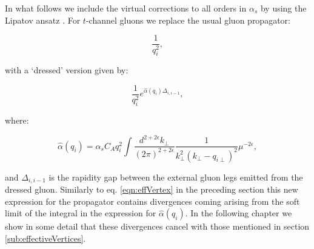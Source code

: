 		In what follows we include the virtual corrections to all orders in $\alpha_s$ by using
		the Lipatov ansatz \cite{Kuraev:1976ge}.  For $t$-channel gluons we replace the usual
		gluon propagator:

		\begin{equation}
			\frac{1}{q_i^2},
		\end{equation}

		with a `dressed' version given by:

		\begin{equation}
			\frac{1}{q_i^2}e^{\hat{\alpha}(q_i)\Delta_{i,i-1}},
		\end{equation}

		where:

		\begin{equation}
			\hat{\alpha}(q_i) = \alpha_sC_Aq_i^2\int \frac{d^{2+2\epsilon}k_{\perp}}{(2\pi)^{2+2\epsilon}}
			\frac{1}{k^2_\perp(k_\perp - q_{i\perp})^2}\mu^{-2\epsilon},
		\end{equation}

		and $\Delta_{i,i-1}$ is the rapidity gap between the external gluon legs emitted from
		the dressed gluon.  Similarly to eq. \eqref{eqn:effVertex} in the preceding section this
		new expression for the propagator contains divergences coming arising from the soft limit
		of the integral in the expression for $\hat{\alpha}(q_i)$.  In the following chapter we
		show in some detail that these divergences cancel with those mentioned in section
		\ref{sub:effectiveVertices}.
